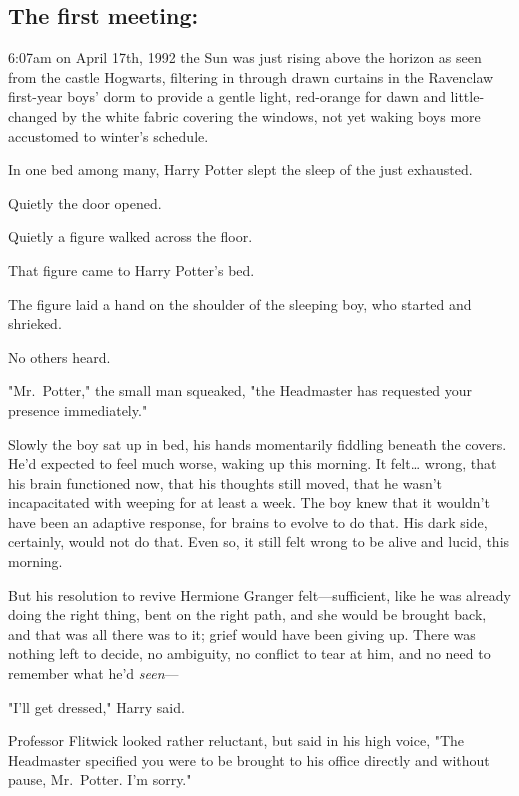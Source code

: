 
\subsection{The first meeting:}

 6:07am on April 17th, 1992 the Sun was just rising above the horizon as seen 
from the castle Hogwarts, filtering in through drawn curtains in the Ravenclaw 
first-year boys' dorm to provide a gentle light, red-orange for dawn and 
little-changed by the white fabric covering the windows, not yet waking boys 
more accustomed to winter's schedule.

In one bed among many, Harry Potter slept the sleep of the just exhausted.

Quietly the door opened.

Quietly a figure walked across the floor.

That figure came to Harry Potter's bed.

The figure laid a hand on the shoulder of the sleeping boy, who started and 
shrieked.

No others heard.

"Mr.~Potter," the small man squeaked, "the Headmaster has requested your 
presence immediately."

Slowly the boy sat up in bed, his hands momentarily fiddling beneath the 
covers. He'd expected to feel much worse, waking up this morning. It 
felt{\ldots} wrong, that his brain functioned now, that his thoughts still 
moved, that he wasn't incapacitated with weeping for at least a week. The boy 
knew that it wouldn't have been an adaptive response, for brains to evolve to 
do that. His dark side, certainly, would not do that. Even so, it still felt 
wrong to be alive and lucid, this morning.

But his resolution to revive Hermione Granger felt---sufficient, like he was 
already doing the right thing, bent on the right path, and she would be brought 
back, and that was all there was to it; grief would have been giving up. There 
was nothing left to decide, no ambiguity, no conflict to tear at him, and no 
need to remember what he'd \emph{seen}---

"I'll get dressed," Harry said.

Professor Flitwick looked rather reluctant, but said in his high voice, "The 
Headmaster specified you were to be brought to his office directly and without 
pause, Mr.~Potter. I'm sorry."

